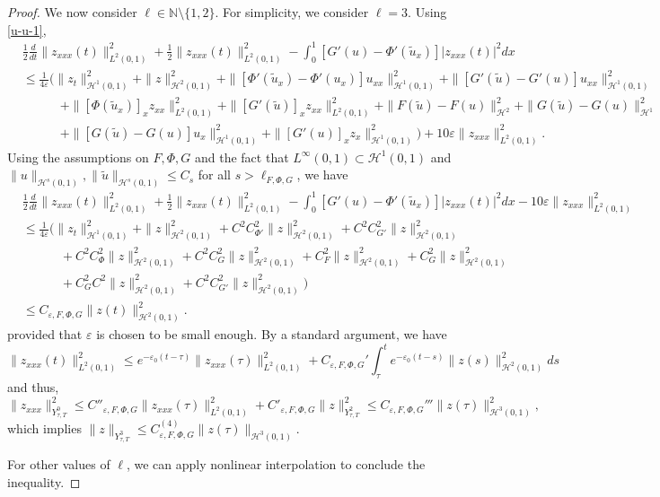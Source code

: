 \documentclass[10pt,a4paper,final]{article}
\numberwithin{equation}{section}
\newcommand{\N}{\mathbb{N}}
\newcommand{\cH}{\mathcal{H}}
\newcommand{\Ge}{\varepsilon}
\begin{document}
\begin{proof}
We now consider $\ell\in \N\setminus\{1,2\}$. For simplicity, we consider $\ell=3$. Using \eqref{u-u-1}, 
\begin{align}\label{zxxxineq}
    &\frac{1}{2}\frac{d}{dt}\|z_{xxx}(t)\|_{L^2(0,1)}^2+\frac{1}{2}\|z_{xxx}(t)\|_{L^2(0,1)}^2-\int_0^1[G'(u)-\Phi'(\widetilde{u}_x)]|z_{xxx}(t)|^2dx \nonumber\\
    &\leq \frac{1}{4\Ge}(\|z_t\|_{\cH^1(0,1)}^2+\|z\|_{\cH^2(0,1)}^2+\|[\Phi'(\widetilde{u}_x)-\Phi'(u_x)]u_{xx}\|_{\cH^1(0,1)}^2+\|[G'(\widetilde{u})-G'(u)]u_{xx}\|_{\cH^1(0,1)}^2\nonumber\\
    &\quad\quad\quad+\|[\Phi(\widetilde{u}_x)]_xz_{xx}\|_{L^2(0,1)}^2+\|[G'(\widetilde{u})]_xz_{xx}\|_{L^2(0,1)}^2+\|F(\widetilde{u})-F(u)\|_{\cH^{2}}^2+\|G(\widetilde{u})-G(u)\|_{\cH^{1}}^2\nonumber\\
    &\quad\quad\quad + \|[G(\widetilde{u})-G(u)]u_x\|_{\cH^1(0,1)}^2+\|[G'(u)]_xz_x\|_{\cH^1(0,1)}^2)+10\Ge\|z_{xxx}\|_{L^2(0,1)}^2. 
\end{align}
Using the assumptions on $F, \Phi,G$ and the fact that $L^{\infty}(0,1)\subset \cH^1(0,1)$ and $\|u\|_{\cH^s(0,1)},\|\widetilde{u}\|_{\cH^s(0,1)}\leq C_{s}$ for all $s>\ell_{F,\Phi,G}$, we have 
\begin{align*}
    &\frac{1}{2}\frac{d}{dt}\|z_{xxx}(t)\|_{L^2(0,1)}^2+\frac{1}{2}\|z_{xxx}(t)\|_{L^2(0,1)}^2-\int_0^1[G'(u)-\Phi'(\widetilde{u}_x)]|z_{xxx}(t)|^2dx-10\Ge\|z_{xxx}\|_{L^2(0,1)}^2\\
    &\leq \frac{1}{4\Ge}(\|z_t\|_{\cH^1(0,1)}^2+\|z\|_{\cH^2(0,1)}^2+C^2C_{\Phi'}^2\|z\|_{\cH^2(0,1)}^2+C^2C^2_{G'}\|z\|_{\cH^2(0,1)}^2\\
&\quad\quad\quad+C^2C_{\Phi}^2\|z\|_{\cH^2(0,1)}^2+C^2C_{G}^2\|z\|_{\cH^2(0,1)}^2+C_F^2\|z\|_{\cH^{2}(0,1)}^2+C_G^2\|z\|_{\cH^{2}(0,1)}^2\\
    &\quad\quad\quad + C_G^2C^2 \|z\|^2_{\cH^2(0,1)}+C^2C_{G'}^2\|z\|_{\cH^2(0,1)}^2)\\
    &\leq C_{\Ge,F,\Phi,G}\|z(t)\|^2_{\cH^{2}(0,1)}.
\end{align*}
provided that $\Ge$ is chosen to be small enough. By a standard argument, we have 
$$\|z_{xxx}(t)\|_{L^2(0,1)}^2\leq e^{-\Ge_0(t-\tau)}\|z_{xxx}(\tau)\|_{L^2(0,1)}^2+C_{\Ge,F,\Phi,G}'\int_{\tau}^{t}e^{-\Ge_0(t-s)}\|z(s)\|_{\cH^2(0,1)}^2ds$$
and thus,
$$\|z_{xxx}\|_{Y^{0}_{\tau,T}}^2\leq C''_{\Ge,F,\Phi,G}\|z_{xxx}(\tau)\|_{L^2(0,1)}^2+ C'_{\Ge,F,\Phi,G}\|z\|_{Y^{2}_{\tau,T}}^2\leq C_{\Ge,F,\Phi,G}'''\|z(\tau)\|_{\cH^3(0,1)}^2,$$
which implies $\|z\|_{Y^3_{\tau,T}}\leq C_{\Ge,F,\Phi,G}^{(4)}\|z(\tau)\|_{\cH^3(0,1)}$.

For other values of $\ell$, we can apply nonlinear interpolation to conclude the inequality.
\end{proof}
\end{document}
